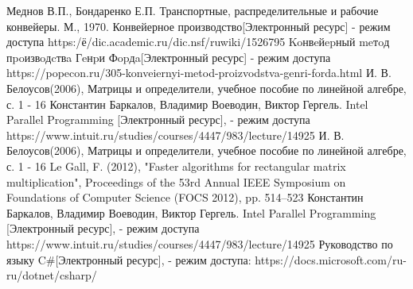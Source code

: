 \documentclass[12pt]{report}
\begin{document}
\newpage
{}
\renewcommand\bibname{Список литературы}
\begin{thebibliography}{3}
	 Меднов В.П., Бондаренко Е.П. Транспортные, распределительные и рабочие конвейеры. М., 1970.
	 Конвейерное производство[Электронный ресурс] - режим доступа https:/ё/dic.academic.ru/dic.nsf/ruwiki/1526795
	 Koнвeйepный meтoд пpoизвoдcтвa Гeнpи Фopдa[Электронный ресурс] - режим доступа https://popecon.ru/305-konveiernyi-metod-proizvodstva-genri-forda.html
	 И. В. Белоусов(2006), Матрицы и определители, учебное пособие по линейной алгебре, с. 1 - 16
	 Константин Баркалов, Владимир Воеводин, Виктор Гергель. Intel Parallel Programming [Электронный ресурс], - режим доступа https://www.intuit.ru/studies/courses/4447/983/lecture/14925
	 И. В. Белоусов(2006), Матрицы и определители, учебное пособие по линейной алгебре, с. 1 - 16
	 Le Gall, F. (2012), "Faster algorithms for rectangular matrix multiplication", Proceedings of the 53rd Annual IEEE Symposium on Foundations of Computer Science (FOCS 2012), pp. 514–523
	 Константин Баркалов, Владимир Воеводин, Виктор Гергель. Intel Parallel Programming [Электронный ресурс], - режим доступа https://www.intuit.ru/studies/courses/4447/983/lecture/14925
	 Руководство по языку C\#[Электронный ресурс], - режим доступа: https://docs.microsoft.com/ru-ru/dotnet/csharp/
\end{thebibliography}
\end{document}
